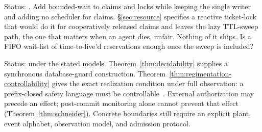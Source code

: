 \documentclass[11pt,a4paper]{article}
\theoremstyle{definition}
\theoremstyle{remark}
\begin{document}
\begin{description}[leftmargin=2.2em,style=nextline]
\item[$\bigstar$ OP-1: Fair exclusion without a scheduler.] Status: \Open. Add
bounded-wait to claims and locks while keeping the single writer and adding no
scheduler for claims. \S\ref{sec:resource} specifies a reactive
ticket-lock that would do it for cooperatively released claims and leaves the lazy
TTL-sweep path, the one that matters when an agent dies, unfair. Nothing of it
ships. Is a FIFO wait-list of time-to-live'd reservations enough once the sweep is
included?
\item[$\bigstar$ OP-2: Regimentation vs.\ detection boundary.] Status: \Closed{} under the stated models.
Theorem~\ref{thm:decidability} supplies a synchronous database-guard
construction. Theorem~\ref{thm:regimentation-controllability} gives the exact
realization condition under full observation: a prefix-closed safety language
must be controllable~. External authorization may precede
an effect; post-commit monitoring alone cannot prevent that effect
(Theorem~\ref{thm:schneider}). Concrete boundaries still require an explicit
plant, event alphabet, observation model, and admission protocol.


\end{description}
\end{document}
